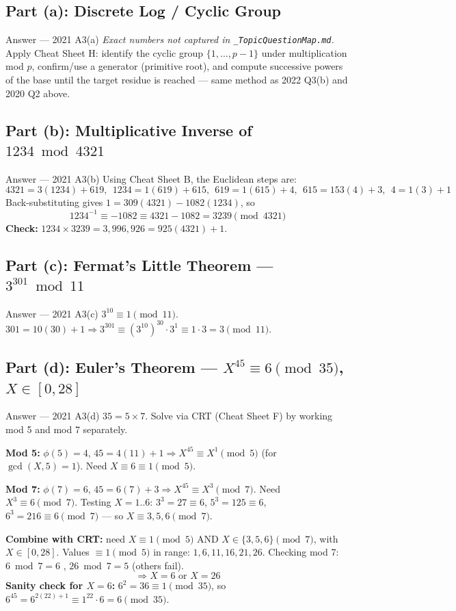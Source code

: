 \documentclass[12pt,a4paper]{article}
\begin{document}
\subsection{Part (a): Discrete Log / Cyclic Group}
\begin{solbox}{Answer --- 2021 A3(a)}
\textit{Exact numbers not captured in \texttt{\_TopicQuestionMap.md}.} Apply Cheat Sheet H: identify the cyclic group $\{1,\dots,p-1\}$ under multiplication mod $p$, confirm/use a generator (primitive root), and compute successive powers of the base until the target residue is reached --- same method as 2022 Q3(b) and 2020 Q2 above.
\end{solbox}

\subsection{Part (b): Multiplicative Inverse of $1234 \bmod 4321$}
\begin{solbox}{Answer --- 2021 A3(b)}
Using Cheat Sheet B, the Euclidean steps are:
\[
4321=3(1234)+619,\ \ 1234=1(619)+615,\ \ 619=1(615)+4,\ \ 615=153(4)+3,\ \ 4=1(3)+1
\]
Back-substituting gives $1=309(4321)-1082(1234)$, so
\[
1234^{-1} \equiv -1082 \equiv 4321-1082 = \boxed{3239} \pmod{4321}
\]
\textbf{Check:} $1234\times3239 = 3{,}996{,}926 = 925(4321)+1$. \checkmark
\end{solbox}

\subsection{Part (c): Fermat's Little Theorem --- $3^{301}\bmod11$}
\begin{solbox}{Answer --- 2021 A3(c)}
$3^{10}\equiv1\pmod{11}$. $301=10(30)+1 \Rightarrow 3^{301}\equiv(3^{10})^{30}\cdot3^1\equiv1\cdot3=\boxed{3}\pmod{11}$.
\end{solbox}

\subsection{Part (d): Euler's Theorem --- $X^{45}\equiv6\pmod{35}$, $X\in[0,28]$}
\begin{solbox}{Answer --- 2021 A3(d)}
$35=5\times7$. Solve via CRT (Cheat Sheet F) by working mod 5 and mod 7 separately.

\textbf{Mod 5:} $\phi(5)=4$, $45=4(11)+1 \Rightarrow X^{45}\equiv X^1\pmod5$ (for $\gcd(X,5)=1$). Need $X\equiv6\equiv1\pmod5$.

\textbf{Mod 7:} $\phi(7)=6$, $45=6(7)+3 \Rightarrow X^{45}\equiv X^3\pmod7$. Need $X^3\equiv6\pmod7$. Testing $X=1..6$: $3^3=27\equiv6$, $5^3=125\equiv6$, $6^3=216\equiv6 \pmod7$ --- so $X\equiv3,5,6\pmod7$.

\textbf{Combine with CRT:} need $X\equiv1\pmod5$ AND $X\in\{3,5,6\}\pmod7$, with $X\in[0,28]$.
Values $\equiv1\pmod5$ in range: $1,6,11,16,21,26$. Checking mod 7: $6\bmod7=6$ \checkmark, $26\bmod7=5$ \checkmark (others fail).
\[
\Rightarrow X = \boxed{6} \text{ or } X=\boxed{26}
\]
\textbf{Sanity check for $X=6$:} $6^2=36\equiv1\pmod{35}$, so $6^{45}=6^{2(22)+1}\equiv1^{22}\cdot6=6\pmod{35}$. \checkmark
\end{solbox}
\end{document}
